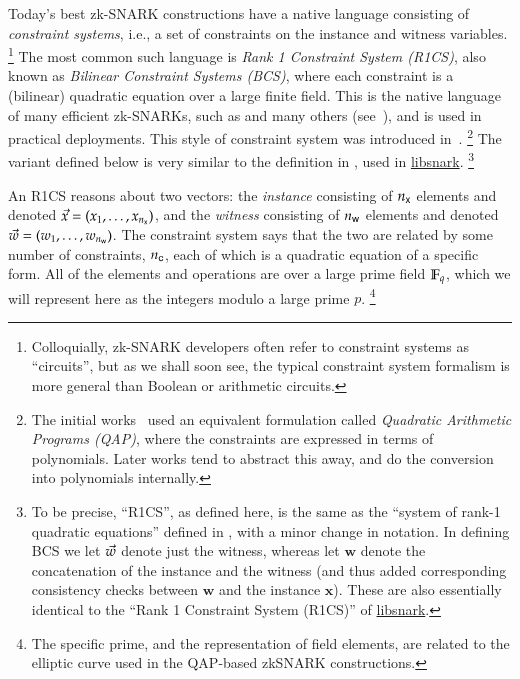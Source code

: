 Today's best zk-SNARK constructions have a native language consisting of \emph{constraint systems}, i.e., a set of constraints on the instance and witness variables.%
%
\footnote{Colloquially, zk-SNARK developers often refer to constraint systems as ``circuits'', but as we shall soon see, the typical constraint system formalism is more general than Boolean or arithmetic circuits.} %
%
The most common such language is \emph{Rank 1 Constraint System (R1CS)}, also known as \emph{Bilinear Constraint Systems (BCS)}, where each constraint is a (bilinear) quadratic equation over a large finite field.  This is the native language of many efficient zk-SNARKs, such as \cite{GGPR13qsp,PHGR13pinocchio,BCGTV13csnark-crypto,BCTV13von,Groth16size} and many others (see~\cite{ZKProofImplementation}), and is used in practical deployments.
This style of constraint system was introduced in~\cite{GGPR13qsp}.%
%
\footnote{The initial works~\cite{GGPR13qsp,PHGR13pinocchio} used an equivalent formulation called \emph{Quadratic Arithmetic Programs (QAP)}, where the constraints are expressed in terms of polynomials. Later works tend to abstract this away, and do the conversion into polynomials internally.} %
%
The variant defined below is very similar to the definition in \cite[Appendix~E]{BCGTV13csnark-eprint}, used in \href{https://github.com/scipr-lab/libsnark}{libsnark}.%
%
\footnote{To be precise, ``R1CS'', as defined here, is the same as the ``system of rank-1 quadratic equations'' defined in \cite[Appendix~E]{BCGTV13csnark-eprint}, with a minor change in notation. In defining BCS we let $\vec{w}$ denote just the witness, whereas \cite{BCGTV13csnark-eprint} let $\mathbf{w}$ denote the concatenation of the instance and the witness (and thus added corresponding consistency checks between $\mathbf{w}$ and the instance $\mathbf{x}$). These are also essentially identical to the ``Rank 1 Constraint System (R1CS)'' of \href{https://github.com/scipr-lab/libsnark}{libsnark}.}

An R1CS reasons about two vectors: the \emph{instance} consisting of ${n_{\mathsf{x}}}$ elements and denoted $\vec{x}=(x_1,\ldots,x_{n_{\mathsf{x}}})$, and the \emph{witness} consisting of ${n_{\mathsf{w}}}$ elements and denoted $\vec{w}=(w_1,\ldots,w_{n_{\mathsf{w}}})$. The constraint system says that the two are related by some number of constraints, $n_{\mathsf{c}}$, each of which is a quadratic equation of a specific form. All of the elements and operations are over a large prime field $\mathbb{F}_{q}$, which we will represent here as the integers modulo a large prime $p$.%
\footnote{The specific prime, and the representation of field elements, are related to the elliptic curve used in the QAP-based zkSNARK constructions.}

